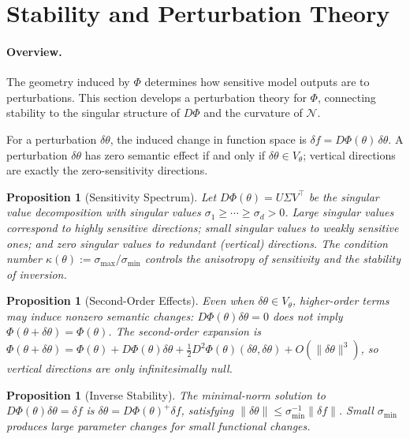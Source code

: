 \documentclass[twocolumn,10pt]{article}
\theoremstyle{thmstyle}
\newtheorem{proposition}[theorem]{Proposition}
\theoremstyle{defstyle}
\begin{document}
\section{Stability and Perturbation Theory}
\label{sec:stability}

\paragraph{Overview.}
The geometry induced by $\Phi$ determines how sensitive model outputs
are to perturbations. This section develops a perturbation theory for
$\Phi$, connecting stability to the singular structure of $D\Phi$ and
the curvature of $\mathcal{N}$.

For a perturbation $\delta\theta$, the induced change in function space
is $\delta f = D\Phi(\theta)\,\delta\theta$. A perturbation $\delta\theta$
has zero semantic effect if and only if $\delta\theta \in V_\theta$;
vertical directions are exactly the zero-sensitivity directions.

\begin{proposition}[Sensitivity Spectrum]
Let $D\Phi(\theta) = U\Sigma V^\top$ be the singular value
decomposition with singular values $\sigma_1 \geq \cdots \geq \sigma_d > 0$.
Large singular values correspond to highly sensitive directions; small
singular values to weakly sensitive ones; and zero singular values to
redundant (vertical) directions. The condition number
$\kappa(\theta) := \sigma_{\max}/\sigma_{\min}$ controls the anisotropy
of sensitivity and the stability of inversion.
\end{proposition}

\begin{proposition}[Second-Order Effects]
Even when $\delta\theta \in V_\theta$, higher-order terms may induce
nonzero semantic changes: $D\Phi(\theta)\delta\theta = 0$ does not
imply $\Phi(\theta + \delta\theta) = \Phi(\theta)$. The second-order
expansion is
$\Phi(\theta + \delta\theta) = \Phi(\theta) + D\Phi(\theta)\delta\theta
+ \tfrac{1}{2}D^2\Phi(\theta)(\delta\theta,\delta\theta) + O(\|\delta\theta\|^3)$,
so vertical directions are only infinitesimally null.
\end{proposition}

\begin{proposition}[Inverse Stability]
The minimal-norm solution to $D\Phi(\theta)\delta\theta = \delta f$ is
$\delta\theta = D\Phi(\theta)^+\delta f$, satisfying
$\|\delta\theta\| \leq \sigma_{\min}^{-1}\|\delta f\|$.
Small $\sigma_{\min}$ produces large parameter changes for small
functional changes.
\end{proposition}
\end{document}
